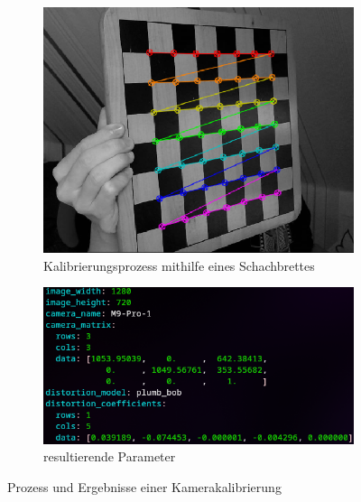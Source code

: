 \documentclass[12pt, ngerman]{article}
\begin{document}
\vspace{10pt}
\begin{figure}[htbp!]
  \centering
  \begin{subfigure}[c]{0.45\textwidth}
    \centering
    \includegraphics[width=\textwidth]{calibration.png}
    \caption{Kalibrierungsprozess mithilfe eines Schachbrettes}
    \label{Abb: calibration}
  \end{subfigure}
  \hfill
  \begin{subfigure}[c]{0.45\textwidth}
      \centering
      \includegraphics[width=\textwidth]{calibration-data.png}
      \caption{resultierende Parameter}
      \label{Abb: calibration-data}
  \end{subfigure}
  \caption{Prozess und Ergebnisse einer Kamerakalibrierung}
  \label{Abb: camera_calibration}
\end{figure}
\end{document}
